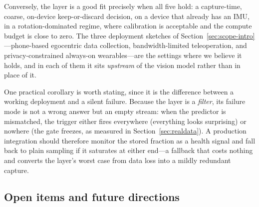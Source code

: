 \documentclass[12pt,a4paper]{article}
\begin{document}
Conversely, the layer is a good fit precisely when all five hold: a capture-time, coarse, on-device keep-or-discard decision, on a device that already has an IMU, in a rotation-dominated regime, where calibration is acceptable and the compute budget is close to zero. The three deployment sketches of Section~\ref{sec:scope-intro}---phone-based egocentric data collection, bandwidth-limited teleoperation, and privacy-constrained always-on wearables---are the settings where we believe it holds, and in each of them it sits \emph{upstream} of the vision model rather than in place of it.

One practical corollary is worth stating, since it is the difference between a working deployment and a silent failure. Because the layer is a \emph{filter}, its failure mode is not a wrong answer but an empty stream: when the predictor is mismatched, the trigger either fires everywhere (everything looks surprising) or nowhere (the gate freezes, as measured in Section~\ref{sec:realdata}). A production integration should therefore monitor the stored fraction as a health signal and fall back to plain sampling if it saturates at either end---a fallback that costs nothing and converts the layer's worst case from data loss into a mildly redundant capture.

\subsection{Open items and future directions}
\end{document}

